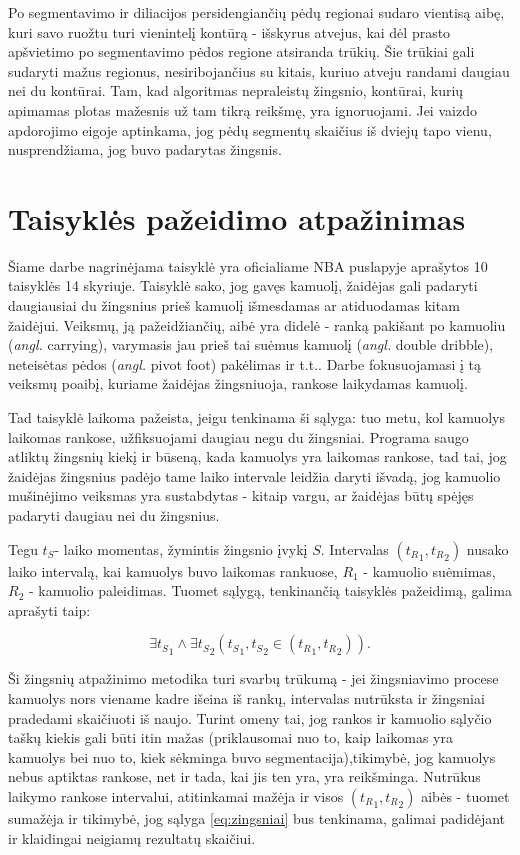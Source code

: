 \documentclass{VUMIFPSkursinis}
\begin{document}
 Po segmentavimo ir diliacijos persidengiančių pėdų regionai sudaro vientisą aibę, kuri savo ruožtu turi vienintelį kontūrą - išskyrus atvejus, kai dėl prasto apšvietimo po segmentavimo pėdos regione atsiranda trūkių. Šie trūkiai gali sudaryti mažus regionus, nesiribojančius su kitais, kuriuo atveju randami daugiau nei du kontūrai. Tam, kad algoritmas nepraleistų žingsnio, kontūrai, kurių apimamas plotas mažesnis už tam tikrą reikšmę, yra ignoruojami. Jei vaizdo apdorojimo eigoje aptinkama, jog pėdų segmentų skaičius iš dviejų tapo vienu, nusprendžiama, jog buvo padarytas žingsnis. 

\section{Taisyklės pažeidimo atpažinimas}
Šiame darbe nagrinėjama taisyklė yra oficialiame NBA puslapyje aprašytos 10 taisyklės 14 skyriuje. Taisyklė sako, jog gavęs kamuolį, žaidėjas gali padaryti daugiausiai du žingsnius prieš kamuolį išmesdamas ar atiduodamas kitam žaidėjui. Veiksmų, ją pažeidžiančių, aibė yra didelė - ranką pakišant po kamuoliu (\textit{angl.} carrying), varymasis jau prieš tai suėmus kamuolį (\textit{angl.} double dribble), neteisėtas pėdos (\textit {angl.} pivot foot) pakėlimas ir t.t.. Darbe fokusuojamasi į tą veiksmų poaibį, kuriame žaidėjas žingsniuoja, rankose laikydamas kamuolį. 

Tad taisyklė laikoma pažeista, jeigu tenkinama ši sąlyga:  tuo metu, kol kamuolys laikomas rankose, užfiksuojami daugiau negu du žingsniai. Programa saugo atliktų žingsnių kiekį ir būseną, kada kamuolys yra laikomas rankose, tad tai, jog žaidėjas žingsnius padėjo tame laiko intervale leidžia daryti išvadą, jog kamuolio mušinėjimo veiksmas yra sustabdytas - kitaip vargu, ar žaidėjas būtų spėjęs padaryti daugiau nei du žingsnius. 

Tegu $t_S$- laiko momentas, žymintis žingsnio įvykį $S$. Intervalas $({t_R}_1,{ t_R}_2)$ nusako laiko intervalą, kai kamuolys buvo laikomas rankuose, $R_1$ - kamuolio suėmimas, $R_2$ - kamuolio paleidimas. Tuomet sąlygą, tenkinančią taisyklės pažeidimą, galima aprašyti taip: 

\begin{equation}\label{eq:zingsniai}
\exists {t_S}_1\land \exists {t_S}_2 ( {{t_S}_1,  {t_S}_2} \in	({t_R}_1, {t_R}_2) ).
\end{equation}

Ši žingsnių atpažinimo metodika turi svarbų trūkumą - jei žingsniavimo procese kamuolys nors viename kadre išeina iš rankų, intervalas nutrūksta ir žingsniai pradedami skaičiuoti iš naujo. Turint omeny tai, jog rankos ir kamuolio sąlyčio taškų kiekis gali būti itin mažas (priklausomai nuo to, kaip laikomas yra kamuolys bei nuo to, kiek sėkminga buvo segmentacija),tikimybė, jog kamuolys nebus aptiktas rankose, net ir tada, kai jis ten yra, yra reikšminga. Nutrūkus laikymo rankose intervalui, atitinkamai mažėja ir visos $({t_R}_1,{ t_R}_2)$ aibės - tuomet sumažėja ir tikimybė, jog sąlyga \ref{eq:zingsniai} bus tenkinama, galimai padidėjant ir klaidingai neigiamų rezultatų skaičiui.
\end{document}
